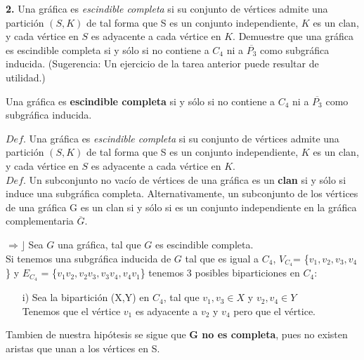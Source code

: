 \documentclass[12pt]{article}
\begin{document}
\vspace{1cm}
%
%
\textbf{2.} Una gráfica es \textit{escindible completa} si su conjunto de vértices admite una partición $(S, K)$
de tal forma que S es un conjunto independiente, $K$ es un clan, y cada vértice en $S$ es
adyacente a cada vértice en $K$. Demuestre que una gráfica es escindible completa si y
sólo si no contiene a $C_4$ ni a $\overline{P_3}$ como subgráfica inducida. (Sugerencia: Un ejercicio de
la tarea anterior puede resultar de utilidad.)
\vspace{1cm}
\begin{tcolorbox}[title=\textbf{Hipótesis}, colback=red!15!white, colframe=black!]
	Una gráfica es \textbf{escindible completa} si y sólo si no contiene a $C_4$ ni a $\overline{P_3}$ como subgráfica inducida.
\end{tcolorbox}
	
\begin{tcolorbox}[title=\textbf{Definiciones}, colback=blue!15!white, colframe=black!]
    $Def$. Una gráfica es \textit{escindible completa} si su conjunto de vértices admite una partición $(S, K)$
de tal forma que S es un conjunto independiente, $K$ es un clan, y cada vértice en $S$ es
adyacente a cada vértice en $K$.\\
	$Def$. Un subconjunto no vacío de vértices de una gráfica es un \textbf{clan} si y sólo si induce una subgráfica completa. Alternativamente, un subconjunto de los vértices de una gráfica G es un clan si y sólo si es un conjunto
independiente en la gráfica complementaria $\overline{G}$.
\end{tcolorbox}

$\Rightarrow \rfloor$ Sea $G$ una gráfica, tal que $G$ es escindible completa.\\

Si tenemos una subgráfica inducida de $G$ tal que es igual a $C_4$, $V_{C_4}$= \{$v_1,v_2,v_3,v_4$\} y $E_{C_4}$ = \{$v_1v_2,v_2v_3,v_3v_4,v_4v_1$\} tenemos 3 posibles biparticiones en $C_4$:

\begin{enumerate}
 \item[i)] Sea la bipartición (X,Y) en $C_4$, tal que $v_1,v_3 \in X$ y $v_2,v_4 \in Y$\\
 
 Tenemos que el vértice $v_1$ es adyacente a $v_2$ y $v_4$ pero que el vértice.
\end{enumerate}

Tambien de nuestra hipótesis se sigue que \textbf{G no es completa}, pues no existen aristas que unan a los vértices en S.
\end{document}
